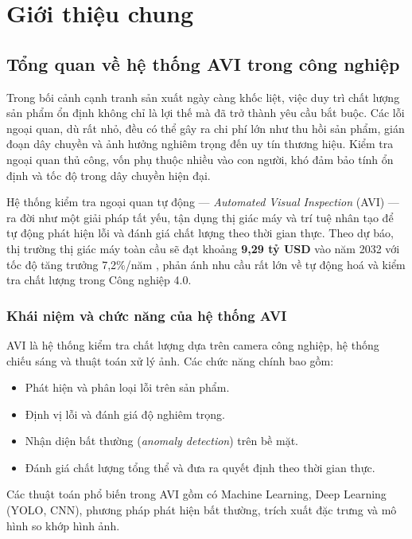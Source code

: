 \chapter{Giới thiệu chung}

\section{Tổng quan về hệ thống AVI trong công nghiệp}

Trong bối cảnh cạnh tranh sản xuất ngày càng khốc liệt, việc duy trì chất lượng sản phẩm ổn định không chỉ là lợi thế mà đã trở thành yêu cầu bắt buộc. Các lỗi ngoại quan, dù rất nhỏ, đều có thể gây ra chi phí lớn như thu hồi sản phẩm, gián đoạn dây chuyền và ảnh hưởng nghiêm trọng đến uy tín thương hiệu. Kiểm tra ngoại quan thủ công, vốn phụ thuộc nhiều vào con người, khó đảm bảo tính ổn định và tốc độ trong dây chuyền hiện đại.

Hệ thống kiểm tra ngoại quan tự động — \textit{Automated Visual Inspection} (AVI) — ra đời như một giải pháp tất yếu, tận dụng thị giác máy và trí tuệ nhân tạo để tự động phát hiện lỗi và đánh giá chất lượng theo thời gian thực. Theo dự báo, thị trường thị giác máy toàn cầu sẽ đạt khoảng \textbf{9,29 tỷ USD} vào năm 2032 với tốc độ tăng trưởng 7,2\%/năm \cite{easyodm_AVI2025}, phản ánh nhu cầu rất lớn về tự động hoá và kiểm tra chất lượng trong Công nghiệp 4.0.

\subsection*{Khái niệm và chức năng của hệ thống AVI}

AVI là hệ thống kiểm tra chất lượng dựa trên camera công nghiệp, hệ thống chiếu sáng và thuật toán xử lý ảnh. Các chức năng chính bao gồm:

\begin{itemize}
    \item Phát hiện và phân loại lỗi trên sản phẩm.
    \item Định vị lỗi và đánh giá độ nghiêm trọng.
    \item Nhận diện bất thường (\textit{anomaly detection}) trên bề mặt.
    \item Đánh giá chất lượng tổng thể và đưa ra quyết định theo thời gian thực.
\end{itemize}

Các thuật toán phổ biến trong AVI gồm có Machine Learning, Deep Learning (YOLO, CNN), phương pháp phát hiện bất thường, trích xuất đặc trưng và mô hình so khớp hình ảnh.

